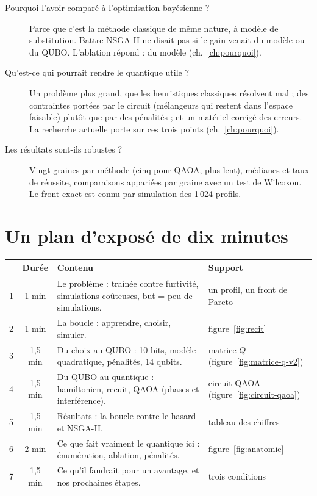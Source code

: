 \begin{description}
\item[Pourquoi l'avoir comparé à l'optimisation bayésienne ?] Parce que c'est la méthode classique de même nature, à modèle de substitution. Battre NSGA-II ne disait pas si le gain venait du modèle ou du QUBO. L'ablation répond : du modèle (ch.~\ref{ch:pourquoi}).
\item[Qu'est-ce qui pourrait rendre le quantique utile ?] Un problème plus grand, que les heuristiques classiques résolvent mal ; des contraintes portées par le circuit (mélangeurs qui restent dans l'espace faisable) plutôt que par des pénalités ; et un matériel corrigé des erreurs. La recherche actuelle porte sur ces trois points (ch.~\ref{ch:pourquoi}).
\item[Les résultats sont-ils robustes ?] Vingt graines par méthode (cinq pour QAOA, plus lent), médianes et taux de réussite, comparaisons appariées par graine avec un test de Wilcoxon. Le front exact est connu par simulation des 1\,024 profils.
\end{description}

\section{Un plan d'exposé de dix minutes}
\begin{center}
\renewcommand{\arraystretch}{1.25}
\small
\begin{tabularx}{\linewidth}{c c >{\raggedright\arraybackslash}X >{\raggedright\arraybackslash}p{3.6cm}}
\toprule
& Durée & Contenu & Support \\
\midrule
1 & 1 min & Le problème : traînée contre furtivité, simulations coûteuses, but = peu de simulations. & un profil, un front de Pareto \\
2 & 1 min & La boucle : apprendre, choisir, simuler. & figure~\ref{fig:recit} \\
3 & 1,5 min & Du choix au QUBO : 10 bits, modèle quadratique, pénalités, 14 qubits. & matrice $Q$ (figure~\ref{fig:matrice-q-v2}) \\
4 & 1,5 min & Du QUBO au quantique : hamiltonien, recuit, QAOA (phases et interférence). & circuit QAOA (figure~\ref{fig:circuit-qaoa}) \\
5 & 1,5 min & Résultats : la boucle contre le hasard et NSGA-II. & tableau des chiffres \\
6 & 2 min & Ce que fait vraiment le quantique ici : énumération, ablation, pénalités. & figure~\ref{fig:anatomie} \\
7 & 1,5 min & Ce qu'il faudrait pour un avantage, et nos prochaines étapes. & trois conditions \\
\bottomrule
\end{tabularx}
\end{center}

